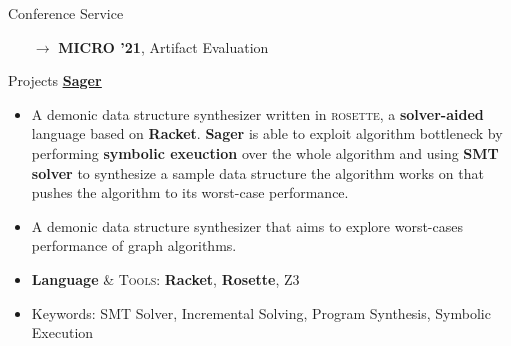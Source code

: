 \documentclass{resume}
\newcommand{\myul}[2][blue]{\setulcolor{#1}\ul{#2}\setulcolor{blue}}
\begin{document}
	\vspace{-5pt}
	\begin{rSection}{Conference Service}
    	\begin{enumerate}
    		\setlength{\itemsep}{1pt}
            \setlength{\parskip}{0pt}
    		\setlength{\parsep}{0pt}
    		\item[$\rightarrow$] \textbf{MICRO '21}, Artifact Evaluation
    	\end{enumerate}
	\end{rSection}
    \begin{rSection}{Projects}
		\textbf{\href{https://github.com/AD1024/Sager}{\color{blue} \myul{Sager}}} %
		\vspace{-5pt}
		\begin{itemize}
			\setlength{\itemsep}{1pt}
            \setlength{\parskip}{0pt}
			\setlength{\parsep}{0pt}
			\item A demonic data structure synthesizer written in \textsc{rosette}, a \textbf{solver-aided} language based on \textbf{Racket}. \textbf{Sager} is able to exploit algorithm bottleneck by performing \textbf{symbolic exeuction} over the whole algorithm and using \textbf{SMT solver} to synthesize a sample data structure the algorithm works on that pushes the algorithm to its worst-case performance.
			\item A demonic data structure synthesizer that aims to explore worst-cases performance of graph algorithms.
			\item \textbf{Language} \& \textsc{Tools}: \textbf{Racket}, \textbf{Rosette}, \textsc{Z3}
			\item Keywords: SMT Solver, Incremental Solving, Program Synthesis, Symbolic Execution
		\end{itemize}
		\vspace{-5pt}


\end{rSection}
\end{document}
